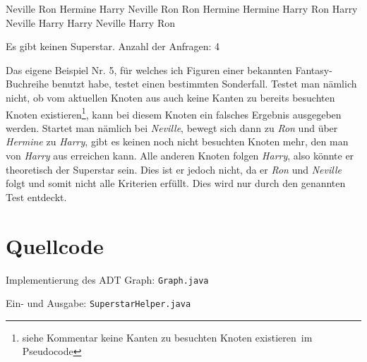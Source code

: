 \documentclass[a4paper, notitlepage, 12pt]{scrartcl}
\newenvironment{longlisting}{\captionsetup{type=listing}}{}
\begin{document}
\begin{MyVerbatim}
Neville Ron Hermine Harry
Neville Ron
Ron Hermine
Hermine Harry
Ron Harry
Neville Harry
Harry Neville
Harry Ron
\end{MyVerbatim}


   \begin{MyVerbatim}
Es gibt keinen Superstar.
Anzahl der Anfragen: 4
   \end{MyVerbatim}

Das eigene Beispiel Nr. 5, für welches ich Figuren einer bekannten Fantasy-Buchreihe benutzt habe, testet einen bestimmten Sonderfall. Testet man nämlich nicht, ob vom aktuellen Knoten aus auch keine Kanten zu bereits besuchten Knoten existieren\footnote{siehe Kommentar \glqq keine Kanten zu besuchten Knoten existieren\grqq ~im Pseudocode}, kann bei diesem Knoten ein falsches Ergebnis ausgegeben werden. Startet man nämlich bei \textit{Neville}, bewegt sich dann zu \textit{Ron} und über \textit{Hermine} zu \textit{Harry}, gibt es keinen noch nicht besuchten Knoten mehr, den man von \textit{Harry} aus erreichen kann. Alle anderen Knoten folgen \textit{Harry}, also könnte er theoretisch der Superstar sein. Dies ist er jedoch nicht, da er \textit{Ron} und \textit{Neville} folgt und somit nicht alle Kriterien erfüllt. Dies wird nur durch den genannten Test entdeckt.

\section{Quellcode}
 \renewcommand{\listingscaption}{Quellcode}

 \begin{longlisting}
 \caption{Implementierung des ADT Graph: \texttt{Graph.java}}
 \end{longlisting}

 \begin{longlisting}
 \caption{Ein- und Ausgabe: \texttt{SuperstarHelper.java}}
 \end{longlisting}

 
\end{document}
